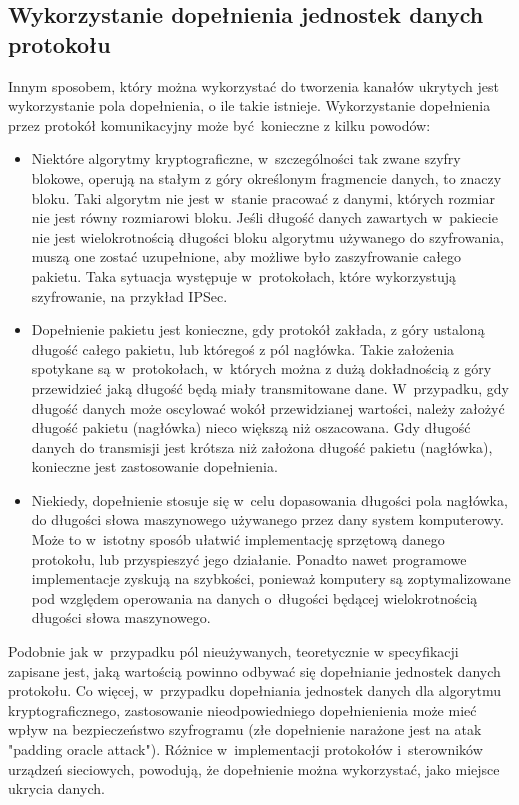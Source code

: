 \documentclass[a4paper, twoside, 12pt]{report}
\begin{document}
        \subsection{Wykorzystanie dopełnienia jednostek danych protokołu}
        Innym sposobem, który można wykorzystać do tworzenia kanałów ukrytych
        jest wykorzystanie pola dopełnienia, o ile takie istnieje.
        Wykorzystanie dopełnienia przez protokół komunikacyjny
        może być konieczne z kilku powodów:
        \begin{itemize}
            \item Niektóre algorytmy kryptograficzne, w~szczególności
        tak zwane szyfry blokowe, operują na stałym z góry określonym fragmencie danych,
        to znaczy bloku. Taki algorytm nie jest w~stanie pracować z danymi, których
        rozmiar nie jest równy rozmiarowi bloku. Jeśli długość
        danych zawartych w~pakiecie nie jest wielokrotnością długości bloku
        algorytmu używanego do szyfrowania, muszą one zostać uzupełnione, aby możliwe
        było zaszyfrowanie całego pakietu. Taka sytuacja występuje w~protokołach,
        które wykorzystują szyfrowanie, na przykład IPSec\cite{IPSECPADDING}.
            \item Dopełnienie pakietu jest konieczne, gdy protokół zakłada, z góry ustaloną długość
        całego pakietu, lub któregoś z pól nagłówka. Takie założenia spotykane są
        w~protokołach, w~których można z dużą dokładnością z góry przewidzieć jaką długość
        będą miały transmitowane dane. W~przypadku, gdy długość danych może oscylować
        wokół przewidzianej wartości, należy założyć długość pakietu (nagłówka)
        nieco większą niż oszacowana. Gdy długość danych do transmisji jest krótsza niż
        założona długość pakietu (nagłówka), konieczne jest zastosowanie dopełnienia.
            \item Niekiedy, dopełnienie stosuje się w~celu dopasowania długości pola nagłówka,
        do długości słowa maszynowego używanego przez dany system komputerowy. Może
        to w~istotny sposób ułatwić implementację sprzętową danego protokołu, lub
        przyspieszyć jego działanie. Ponadto nawet programowe implementacje zyskują
        na szybkości, ponieważ komputery są zoptymalizowane pod względem operowania
        na danych o~długości będącej wielokrotnością długości słowa maszynowego.
        \end{itemize}

        Podobnie jak w~przypadku pól nieużywanych, teoretycznie w specyfikacji
        zapisane jest, jaką wartością powinno odbywać się dopełnianie jednostek danych protokołu.
        Co więcej,
        w~przypadku dopełniania jednostek danych dla algorytmu kryptograficznego, zastosowanie
        nieodpowiedniego dopełnienienia może mieć wpływ na bezpieczeństwo szyfrogramu (złe dopełnienie narażone
        jest na atak "padding oracle attack"). Różnice w~implementacji protokołów
        i~sterowników urządzeń sieciowych, powodują, że dopełnienie można wykorzystać,
        jako miejsce ukrycia danych\cite{PADSTEG}.
\end{document}
